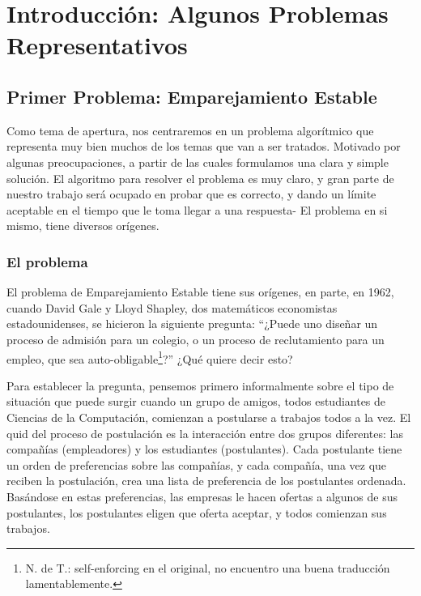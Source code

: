 \documentclass[a4paper, 12pt]{book}
\begin{document}
\chapter{Introducción: Algunos Problemas Representativos}
\label{cap:intro}

\section{Primer Problema: Emparejamiento Estable}

Como tema de apertura, nos centraremos en un problema algorítmico que representa muy bien muchos de los temas que van a ser tratados. Motivado por algunas preocupaciones, a partir de las cuales formulamos una clara y simple solución. El algoritmo para resolver el problema es muy claro,  y gran parte de nuestro trabajo será ocupado en probar que es correcto, y dando un límite aceptable en el tiempo que le toma llegar a una respuesta- El problema en si mismo, tiene diversos orígenes.

\subsection*{El problema}

El problema de Emparejamiento Estable tiene sus orígenes, en parte, en 1962, cuando David Gale y Lloyd Shapley, dos matemáticos economistas estadounidenses, se hicieron la siguiente pregunta: ``¿Puede uno diseñar un proceso de admisión para un colegio, o un proceso de reclutamiento para un empleo, que sea auto-obligable\footnote{N. de T.: self-enforcing en el original, no encuentro una buena traducción lamentablemente.}?''  ¿Qué quiere decir esto?

Para establecer la pregunta, pensemos primero informalmente sobre el tipo de situación que puede surgir cuando un grupo de amigos, todos estudiantes de Ciencias de la Computación, comienzan a postularse a trabajos todos a la vez. El quid del proceso de postulación es la interacción entre dos grupos diferentes: las compañías (empleadores) y los estudiantes (postulantes). Cada postulante tiene un orden de preferencias sobre las compañías, y cada compañía, una vez que reciben la postulación, crea una lista de preferencia de los postulantes ordenada. Basándose en estas preferencias, las empresas le hacen ofertas a algunos de sus postulantes, los postulantes eligen que oferta aceptar, y todos comienzan sus trabajos.  
\end{document}
